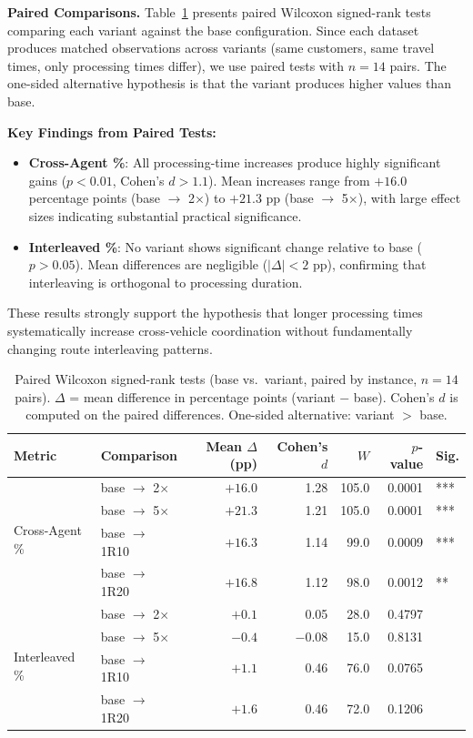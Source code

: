 \documentclass{article}
\newcommand{\tx}{\ensuremath{\times}}
\begin{document}
\textbf{Paired Comparisons.} Table~\ref{tab:hypothesis_tests} presents paired Wilcoxon signed-rank tests comparing each variant against the base configuration. Since each dataset produces matched observations across variants (same customers, same travel times, only processing times differ), we use paired tests with $n = 14$ pairs. The one-sided alternative hypothesis is that the variant produces higher values than base.

\textbf{Key Findings from Paired Tests:}
\begin{itemize}
\item \textbf{Cross-Agent \%}: All processing-time increases produce highly significant gains ($p < 0.01$, Cohen's $d > 1.1$). Mean increases range from $+16.0$ percentage points (base $\to$ 2$\times$) to $+21.3$ pp (base $\to$ 5$\times$), with large effect sizes indicating substantial practical significance.

\item \textbf{Interleaved \%}: No variant shows significant change relative to base ($p > 0.05$). Mean differences are negligible ($|\Delta| < 2$ pp), confirming that interleaving is orthogonal to processing duration.
\end{itemize}

These results strongly support the hypothesis that longer processing times systematically increase cross-vehicle coordination without fundamentally changing route interleaving patterns.

\begin{table}[H]
\centering
\caption{Paired Wilcoxon signed-rank tests (base vs.\ variant, paired by instance, $n = 14$ pairs). $\Delta$ = mean difference in percentage points (variant $-$ base). Cohen's $d$ is computed on the paired differences. One-sided alternative: variant $>$ base.}
\label{tab:hypothesis_tests}
\small
\begin{tabular}{ll rrrrl}
\toprule
\textbf{Metric} & \textbf{Comparison} & \textbf{Mean $\Delta$ (pp)} & \textbf{Cohen's $d$} & \textbf{$W$} & \textbf{$p$-value} & \textbf{Sig.} \\
\midrule
\multirow{4}{*}{Cross-Agent \%}
 & base $\to$ 2\tx   & $+16.0$ & 1.28 & 105.0 & 0.0001 & *** \\
 & base $\to$ 5\tx   & $+21.3$ & 1.21 & 105.0 & 0.0001 & *** \\
 & base $\to$ 1R10 & $+16.3$ & 1.14 &  99.0 & 0.0009 & *** \\
 & base $\to$ 1R20 & $+16.8$ & 1.12 &  98.0 & 0.0012 & **  \\
\midrule
\multirow{4}{*}{Interleaved \%}
 & base $\to$ 2\tx   & $+0.1$  & 0.05 &  28.0 & 0.4797 &     \\
 & base $\to$ 5\tx   & $-0.4$  & $-0.08$ & 15.0 & 0.8131 &     \\
 & base $\to$ 1R10 & $+1.1$  & 0.46 &  76.0 & 0.0765 &     \\
 & base $\to$ 1R20 & $+1.6$  & 0.46 &  72.0 & 0.1206 &     \\
\bottomrule
\end{tabular}
\end{table}
\end{document}
